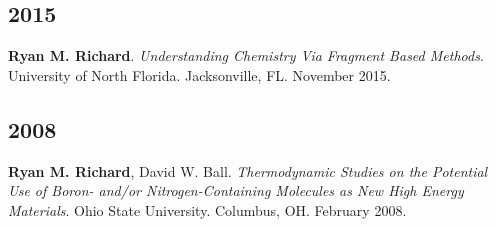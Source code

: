 \begin{etaremune}
	\subsection{2015}
	\item{\textbf{Ryan M. Richard}. \textit{Understanding Chemistry Via Fragment
	      Based Methods}. University of North Florida.  Jacksonville, FL.
		  November 2015.}

	\subsection{2008}
	\item{\textbf{Ryan M. Richard}, David W. Ball. \textit{Thermodynamic Studies
	      on the Potential Use of Boron- and/or Nitrogen-Containing Molecules as
		  New High Energy Materials}. Ohio State University. Columbus, OH.
		  February 2008.}
\end{etaremune}


